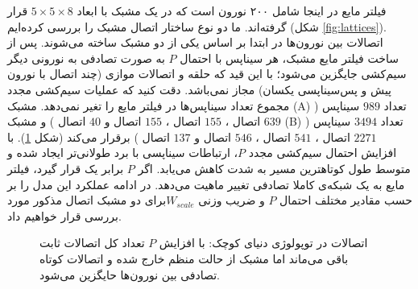 فیلتر مایع در اینجا شامل ۲۰۰ نورون  است که در یک مشبک با ابعاد $5\times5\times8$ قرار گرفته‌اند. ما دو نوع ساختار اتصال مشبک را بررسی کرده‌ایم (شکل \ref{fig:lattices}). اتصالات بین نورون‌ها در ابتدا بر اساس یکی از دو مشبک ساخته می‌شوند. پس از ساخت فیلتر مایع مشبک، هر سیناپس با احتمال $P$ به صورت تصادفی به نورونی دیگر سیم‌کشی جایگزین می‌شود؛ با این قید که حلقه و اتصالات موازی (چند اتصال با نورون پیش و پس‌سیناپسی یکسان) مجاز نمی‌باشد. دقت کنید که عملیات سیم‌کشی مجدد مجموع تعداد سیناپس‌ها در فیلتر مایع را تغیر نمی‌دهد. مشبک (A) تعداد $989$ سیناپس ($639$ اتصال ، $155$ اتصال ، $155$ اتصال  و $40$ اتصال ) و مشبک (B) تعداد $3494$ سیناپس ($2271$ اتصال ، $541$ اتصال ، $546$ اتصال  و $137$ اتصال ) برقرار می‌کند (شکل \ref{fig:sw}). با افزایش احتمال سیم‌کشی مجدد $P$، ارتباطات سیناپسی با برد طولانی‌تر ایجاد شده و متوسط طول کوتاهترین مسیر به شدت کاهش می‌یابد. اگر $P$ برابر یک قرار گیرد، فیلتر مایع به یک شبکه‌ی کاملا تصادفی تغییر ماهیت می‌دهد. در ادامه عملکرد این مدل را بر حسب مقادیر مختلف احتمال $P$ و ضریب وزنی $W_{scale}$برای دو مشبک اتصال مذکور مورد بررسی قرار خواهیم داد.


\begin{figure}
\centering
{\footnotesize
\subfloat[توپولوژی \lr{SW}  نوع \lr{A} با $P=0$]{
	 \texttt{[image: sw\_a\_0]}
	 \label{fig:sw_a_0}
}
\subfloat[توپولوژی \lr{SW}  نوع \lr{B} با $P=0$]{
	 \texttt{[image: sw\_b\_0]}
	  \label{fig:sw_b_0}
}

\subfloat[توپولوژی \lr{SW}  نوع \lr{A} با $P=0.1$]{
	 \texttt{[image: sw\_a\_01]}
	 \label{fig:sw_a_0}
}
\subfloat[توپولوژی \lr{SW}  نوع \lr{B} با $P=0.1$]{
	 \texttt{[image: sw\_b\_01]}
	  \label{fig:sw_b_0}
}
\caption[اتصالات در توپولوژی دنیای کوچک]{اتصالات در توپولوژی دنیای کوچک: با افزایش $P$ تعداد کل اتصالات ثابت باقی می‌ماند اما مشبک از حالت منظم خارج شده و اتصالات کوتاه تصادفی بین نورون‌ها حایگزین می‌شود.}
\label{fig:sw}
}
\end{figure}

